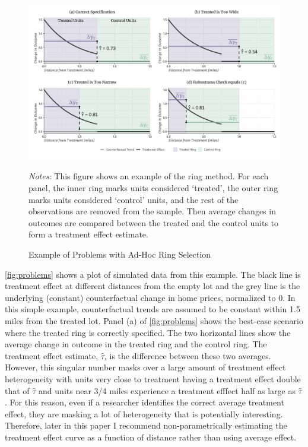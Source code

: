 \documentclass[10pt]{article}
\begin{document}
\begin{figure}[tb]
    \caption{Example of Problems with Ad-Hoc Ring Selection}
    \label{fig:problems}

    \begin{adjustbox}{width = 1.1\textwidth, center}
        \includegraphics[width=\textwidth]{../../figures/example.pdf}
    \end{adjustbox}

    {\footnotesize \emph{Notes:} This figure shows an example of the ring method. For each panel, the inner ring marks units considered `treated', the outer ring marks units considered `control' units, and the rest of the observations are removed from the sample. Then average changes in outcomes are compared between the treated and the control units to form a treatment effect estimate.}
\end{figure}

\autoref{fig:problems} shows a plot of simulated data from this example. The black line is treatment effect at different distances from the empty lot and the grey line is the underlying (constant) counterfactual change in home prices, normalized to 0. In this simple example, counterfactual trends are assumed to be constant within 1.5 miles from the treated lot. Panel (a) of \autoref{fig:problems} shows the best-case scenario where the treated ring is correctly specified. The two horizontal lines show the average change in outcome in the treated ring and the control ring. The treatment effect estimate, $\hat{\tau}$, is the difference between these two averages. However, this singular number masks over a large amount of treatment effect heterogeneity with units very close to treatment having a treatment effect double that of $\hat{\tau}$ and units near 3/4 miles experience a treatment efffect half as large as $\hat{\tau}$. For this reason, even if a researcher identifies the correct average treatment effect, they are masking a lot of heterogeneity that is potentially interesting. Therefore, later in this paper I recommend non-parametrically estimating the treatment effect curve as a function of distance rather than using average effect. 
\end{document}
